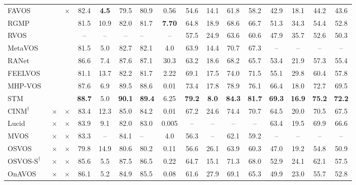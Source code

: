 \documentclass{article}
\begin{document}
\begin{table*}
{\begin{tabular}[t]{lcc cccHc cccc cccc}
        \cmidrule(r){1-16} \cmidrule(lr){4-8} \cmidrule(lr){9-12} \cmidrule(lr){13-16}
FAVOS~\cite{Cheng_favos_2018}        & &$\times$ & 82.4 & \textbf{4.5}  & 79.5 & 80.9 & 0.56 & 54.6 & 14.1  & 61.8 & 58.2 & 42.9 & 18.1 & 44.2 & 43.6 \\
RGMP~\cite{oh2018fast}                  & & & 81.5 & 10.9  & 82.0 & 81.7 & \textbf{7.70} & 64.8 & 18.9 & 68.6 & 66.7 & 51.3 & 34.3 & 54.4 & 52.8 \\
        RVOS~\cite{oh2018fast}                  & & & -- & --  & -- & -- & -- & 57.5 & 24.9 & 63.6 & 60.6 & 47.9 & 35.7 & 52.6 & 50.3\\
        MetaVOS~\cite{meta_words}               & & & 81.5 & 5.0  & 82.7 & 82.1 & 4.0 & 63.9 & 14.4 & 70.7 & 67.3  &--&--&--&--\\
        RANet~\cite{Ziqin2019RANet}             & & & 86.6 & 7.4 & 87.6 & 87.1 & 30.3 & 63.2 & 18.6 & 68.2 & 65.7 & 53.4 & 21.9 & 57.3 & 55.4\\
        FEELVOS~\cite{voigtlaender2019feelvos}  & & & 81.1 & 13.7  & 82.2 & 81.7 & 2.22 & 69.1 & 17.5 & 74.0 & 71.5  & 55.1 & 29.8 & 60.4 & 57.8\\
        MHP-VOS~\cite{xu2019mhp}                & & & 87.6 & 6.9  & 89.5 & 88.6 & 0.01 & 73.4  & 17.8 & 78.9 & 76.1  & 66.4 & 18.0 & 72.7 & 69.5\\
        STM~\cite{STM_19}                       & & & \textbf{88.7} & 5.0  & \textbf{90.1} & \textbf{89.4} & 6.25 & \textbf{79.2} & \textbf{8.0} & \textbf{84.3} & \textbf{81.7} & \textbf{69.3} & \textbf{16.9} & \textbf{75.2} & \textbf{72.2}\\
\cmidrule(r){1-16}
$\textrm{CINM}^{\dagger}$~\cite{cinm}                               &$\times$ &$\times$ & 83.4 & 12.3  & 85.0 & 84.2 & 0.01 & 67.2 & 24.6 & 74.4 & 70.7 & 64.5 & 20.0 & 70.5 & 67.5\\
        Lucid~\cite{lucid}                                                  &$\times$ &$\times$ &83.9 & 9.1  & 82.0 & 83.0 & 0.005 & -- & --  & -- & -- & 63.4 & 19.5 & 69.9 & 66.6\\
        MVOS~\cite{MVOS}                                                &$\times$ &$\times$ & 83.3 & --  & 84.1 & -- & 4.0 & 56.3 & --  & 62.1 & 59.2  &--&--&--&--\\
        OSVOS~\cite{OSVOS}                                                &$\times$ &$\times$ & 79.8 & 14.9  & 80.6 & 80.2 & 0.11 & 56.6 & 26.1  & 63.9 & 60.3 & 47.0 & 19.2 & 54.8 & 50.9\\
        $\textrm{OSVOS-S}^{\dagger}$~\cite{OSVOS-S}                       &$\times$ &$\times$ & 85.6 & 5.5  & 87.5 & 86.5 & 0.22 & 64.7 & 15.1  & 71.3 & 68.0 & 52.9 & 24.1  & 62.1 & 57.5\\
        OnAVOS~\cite{onavos}                                                &$\times$ &$\times$ & 86.1 & 5.2  & 84.9 & 85.5 & 0.08 & 61.6 & 27.9  & 69.1 & 65.3 & 49.9 & 23.0 & 55.7 & 52.8\\


\end{tabular}}
\end{table*}
\end{document}
